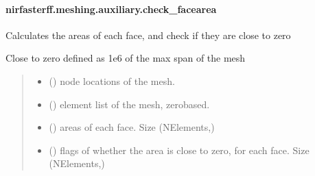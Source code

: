 \documentclass[letterpaper,10pt,english]{sphinxmanual}
\begin{document}
\sphinxstepscope


\paragraph{nirfasterff.meshing.auxiliary.check\_facearea}
\label{\detokenize{_autosummary/nirfasterff.meshing.auxiliary.check_facearea:nirfasterff-meshing-auxiliary-check-facearea}}\label{\detokenize{_autosummary/nirfasterff.meshing.auxiliary.check_facearea::doc}}

\begin{fulllineitems}
\label{\detokenize{_autosummary/nirfasterff.meshing.auxiliary.check_facearea:nirfasterff.meshing.auxiliary.check_facearea}}
\pysigstartsignatures
\pysiglinewithargsret
{}
{\sphinxparamcomma {}}
{}
\pysigstopsignatures
\sphinxAtStartPar
Calculates the areas of each face, and check if they are close to zero

\sphinxAtStartPar
Close to zero defined as 1e6 of the max span of the mesh
\begin{quote}\begin{description}
\begin{itemize}
\item {} 
\sphinxAtStartPar
{} () \textendash{} node locations of the mesh.

\item {} 
\sphinxAtStartPar
{} () \textendash{} element list of the mesh, zero\sphinxhyphen{}based.

\end{itemize}

\sphinxAtStartPar
\begin{itemize}
\item {} 
\sphinxAtStartPar
{} () \textendash{} areas of each face. Size (NElements,)

\item {} 
\sphinxAtStartPar
{} () \textendash{} flags of whether the area is close to zero, for each face. Size (NElements,)

\end{itemize}


\end{description}\end{quote}

\end{fulllineitems}
\end{document}

